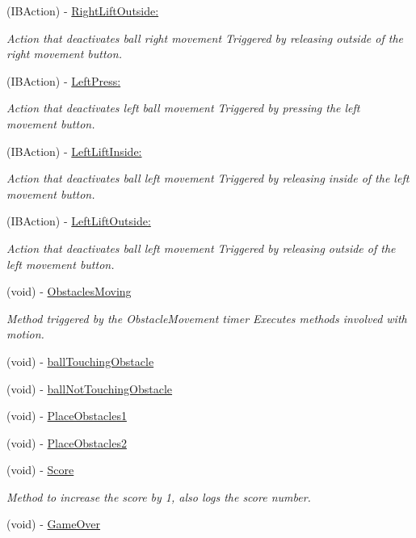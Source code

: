 \begin{DoxyCompactItemize}
(I\+B\+Action) -\/ \hyperlink{interface_game_a10b8c73398f7fc7955092ec555f7ae61}{Right\+Lift\+Outside\+:}
\begin{DoxyCompactList}\small\item\em Action that deactivates ball right movement Triggered by releasing outside of the right movement button. \end{DoxyCompactList}\item 
(I\+B\+Action) -\/ \hyperlink{interface_game_a56b5dd5d335d7abe76c8e679ccd008ee}{Left\+Press\+:}
\begin{DoxyCompactList}\small\item\em Action that deactivates left ball movement Triggered by pressing the left movement button. \end{DoxyCompactList}\item 
(I\+B\+Action) -\/ \hyperlink{interface_game_ae686b4c3b5604a934e5f2e61cb780aa8}{Left\+Lift\+Inside\+:}
\begin{DoxyCompactList}\small\item\em Action that deactivates ball left movement Triggered by releasing inside of the left movement button. \end{DoxyCompactList}\item 
(I\+B\+Action) -\/ \hyperlink{interface_game_af37af92cb4313502176bd9e7104be070}{Left\+Lift\+Outside\+:}
\begin{DoxyCompactList}\small\item\em Action that deactivates ball left movement Triggered by releasing outside of the left movement button. \end{DoxyCompactList}\item 
(void) -\/ \hyperlink{interface_game_a732ad799223c4080df44772ea2d47275}{Obstacles\+Moving}
\begin{DoxyCompactList}\small\item\em Method triggered by the Obstacle\+Movement timer Executes methods involved with motion. \end{DoxyCompactList}\item 
(void) -\/ \hyperlink{interface_game_ad4cd848fd51d1fdca936695d886a182a}{ball\+Touching\+Obstacle}
\item 
(void) -\/ \hyperlink{interface_game_aa65335ef3b380bf84588f6ad43c60892}{ball\+Not\+Touching\+Obstacle}
\item 
(void) -\/ \hyperlink{interface_game_a859b5fe67834eaeaac3b758d0a6a6498}{Place\+Obstacles1}
\item 
(void) -\/ \hyperlink{interface_game_af458978203f59ae5fb36b598c770f93c}{Place\+Obstacles2}
\item 
(void) -\/ \hyperlink{interface_game_a5cb9a08f94edfd2c5cf9e265b0ff04e4}{Score}
\begin{DoxyCompactList}\small\item\em Method to increase the score by 1, also logs the score number. \end{DoxyCompactList}\item 
(void) -\/ \hyperlink{interface_game_aeef0f3e9e8d8f2efeb75c10e1dda4ef2}{Game\+Over}
\end{DoxyCompactItemize}
